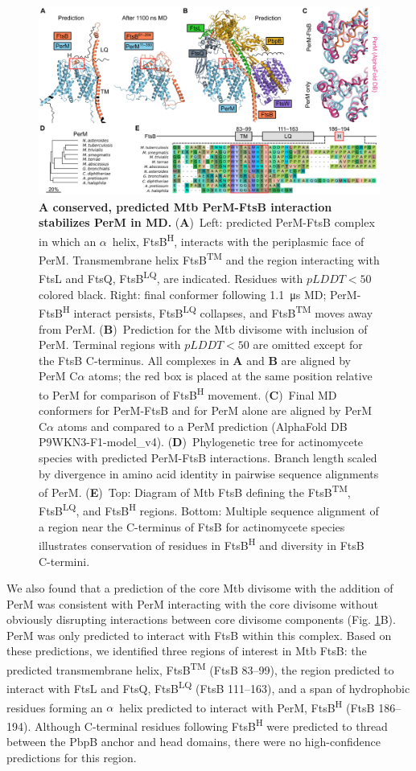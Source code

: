 \documentclass[pdflatex,sn-basic]{sn-jnl}%
\newcommand\mtb{Mtb}
\newcommand\ftsbTM{FtsB\textsuperscript{TM}}
\newcommand\ftsbLQ{FtsB\textsuperscript{LQ}}
\newcommand\ftsbH{FtsB\textsuperscript{H}}
\begin{document}
\begin{figure}[h]
\centering
\includegraphics[width=1.0\textwidth]{../figures/fig1_1.png}
\caption{
    \textbf{A conserved, predicted \mtb{} PerM-FtsB interaction stabilizes PerM in MD.}
    (\textbf{A})~Left: predicted PerM-FtsB complex in which an $\alpha$~helix, \ftsbH{}, interacts with the periplasmic face of PerM. Transmembrane helix \ftsbTM{} and the region interacting with FtsL and FtsQ, \ftsbLQ{}, are indicated. Residues with $pLDDT < 50$ colored black. Right: final conformer following \qty{1.1}{\us} MD; PerM-\ftsbH{} interact persists, \ftsbLQ{} collapses, and \ftsbTM{} moves away from PerM.
    (\textbf{B})~Prediction for the \mtb{} divisome with inclusion of PerM. Terminal regions with $pLDDT < 50$ are omitted except for the FtsB C-terminus. All complexes in \textbf{A} and \textbf{B} are aligned by PerM C$\alpha$ atoms; the red box is placed at the same position relative to PerM for comparison of \ftsbH{} movement.
    (\textbf{C})~Final MD conformers for PerM-FtsB and for PerM alone are aligned by PerM C$\alpha$ atoms and compared to a PerM prediction  (AlphaFold DB P9WKN3-F1-model{\_}v4).
    (\textbf{D})~Phylogenetic tree for actinomycete species with predicted PerM-FtsB interactions. Branch length scaled by divergence in amino acid identity in pairwise sequence alignments of PerM.
    (\textbf{E})~Top: Diagram of \mtb{} FtsB defining the \ftsbTM{}, \ftsbLQ{}, and \ftsbH{} regions. Bottom: Multiple sequence alignment of a region near the C-terminus of FtsB for actinomycete species illustrates conservation of residues in \ftsbH{} and diversity in FtsB C-termini.
}\label{fig1_1}
\end{figure}

We also found that a prediction of the core \mtb{} divisome with the addition of PerM was consistent with PerM interacting with the core divisome without obviously disrupting interactions between core divisome components (Fig. \ref{fig1_1}B).
PerM was only predicted to interact with FtsB within this complex. Based on these predictions, we identified three regions of interest in \mtb{} FtsB: the predicted transmembrane helix, \ftsbTM{} (FtsB 83--99), the region predicted to interact with FtsL and FtsQ, \ftsbLQ{} (FtsB 111--163), and a span of hydrophobic residues forming an $\alpha$~helix predicted to interact with PerM, \ftsbH{} (FtsB 186--194).
Although C-terminal residues following \ftsbH{} were predicted to thread between the PbpB anchor and head domains, there were no high-confidence predictions for this region.
\end{document}
